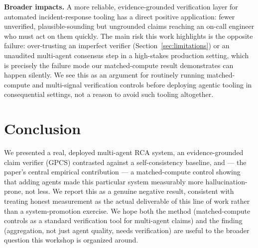 \documentclass{article}
\begin{document}
\textbf{Broader impacts.} A more reliable, evidence-grounded verification
layer for automated incident-response tooling has a direct positive
application: fewer unverified, plausible-sounding but ungrounded claims
reaching an on-call engineer who must act on them quickly. The main risk
this work highlights is the opposite failure: over-trusting an imperfect
verifier (Section~\ref{sec:limitations}) or an unaudited multi-agent
consensus step in a high-stakes production setting, which is precisely
the failure mode our matched-compute result demonstrates can happen
silently. We see this as an argument for routinely running matched-compute
and multi-signal verification controls before deploying agentic tooling
in consequential settings, not a reason to avoid such tooling altogether.

\section{Conclusion}
\label{sec:conclusion}

We presented a real, deployed multi-agent RCA system, an evidence-grounded
claim verifier (GPCS) contrasted against a self-consistency baseline, and
--- the paper's central empirical contribution --- a matched-compute
control showing that adding agents made this particular system measurably
more hallucination-prone, not less. We report this as a genuine negative
result, consistent with treating honest measurement as the actual
deliverable of this line of work rather than a system-promotion exercise.
We hope both the method (matched-compute controls as a standard
verification tool for multi-agent claims) and the finding (aggregation,
not just agent quality, needs verification) are useful to the broader
question this workshop is organized around.
\end{document}
